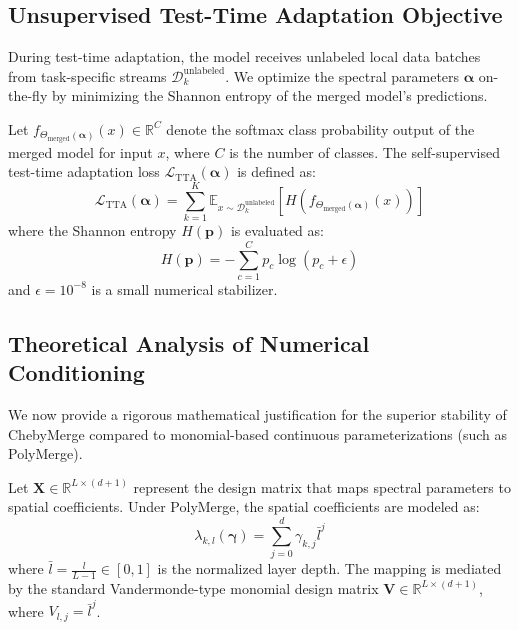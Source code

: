\subsection{Unsupervised Test-Time Adaptation Objective}
During test-time adaptation, the model receives unlabeled local data batches from task-specific streams $\mathcal{D}_k^{\text{unlabeled}}$. We optimize the spectral parameters $\boldsymbol{\alpha}$ on-the-fly by minimizing the Shannon entropy of the merged model's predictions. 

Let $f_{\Theta_{\text{merged}}(\boldsymbol{\alpha})}(x) \in \mathbb{R}^C$ denote the softmax class probability output of the merged model for input $x$, where $C$ is the number of classes. The self-supervised test-time adaptation loss $\mathcal{L}_{\text{TTA}}(\boldsymbol{\alpha})$ is defined as:
\begin{equation}
\mathcal{L}_{\text{TTA}}(\boldsymbol{\alpha}) = \sum_{k=1}^K \mathbb{E}_{x \sim \mathcal{D}_k^{\text{unlabeled}}} \left[ H\left(f_{\Theta_{\text{merged}}(\boldsymbol{\alpha})}(x)\right) \right]
\end{equation}
where the Shannon entropy $H(\mathbf{p})$ is evaluated as:
\begin{equation}
H(\mathbf{p}) = -\sum_{c=1}^C p_c \log (p_c + \epsilon)
\end{equation}
and $\epsilon = 10^{-8}$ is a small numerical stabilizer. 

\subsection{Theoretical Analysis of Numerical Conditioning}
We now provide a rigorous mathematical justification for the superior stability of ChebyMerge compared to monomial-based continuous parameterizations (such as PolyMerge).

Let $\mathbf{X} \in \mathbb{R}^{L \times (d+1)}$ represent the design matrix that maps spectral parameters to spatial coefficients. Under PolyMerge, the spatial coefficients are modeled as:
\begin{equation}
\lambda_{k, l}(\boldsymbol{\gamma}) = \sum_{j=0}^d \gamma_{k, j} \bar{l}^j
\end{equation}
where $\bar{l} = \frac{l}{L-1} \in [0, 1]$ is the normalized layer depth. The mapping is mediated by the standard Vandermonde-type monomial design matrix $\mathbf{V} \in \mathbb{R}^{L \times (d+1)}$, where $V_{l, j} = \bar{l}^j$.

